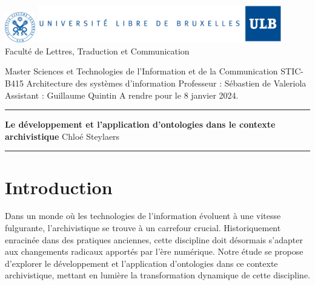 \documentclass[12pt]{report}
\begin{document}
    \begin{titlepage}
        \begin{center}
        \includegraphics[width=0.1\textwidth, margin= 0 -1.5cm 0 0]{l.jpg}
        \includegraphics[width=0.8\textwidth]{u.jpg}
        \vspace{0.5cm}
      \newline Faculté de Lettres, Traduction et Communication
     \end{center}
     \vspace*{1cm}
     Master Sciences et Technologies de l'Information et de la Communication
     \newline STIC-B415  Architecture des systèmes d'information 
       \vspace*{0,5cm}
        \newline Professeur : Sébastien de Valeriola
        \newline Assistant : Guillaume Quintin
     \newline A rendre pour le 8 janvier 2024.
      \vspace*{0,5cm}
     \newline \rule{11cm}{0,02cm}
     \vspace*{1,5cm}
     \newline \textbf{{\Large Le développement et l'application d'ontologies dans le contexte archivistique}}
       \vspace*{0,5cm}
     \vspace*{1cm}
     \newline Chloé Steylaers
     \vspace*{1,5cm}
     \newline \rule{4cm}{0,02cm}
\end{titlepage}
\newpage
\tableofcontents
\newpage
\chapter{Introduction}
Dans un monde où les technologies de l'information évoluent à une vitesse fulgurante, l'archivistique se trouve à un carrefour crucial. Historiquement enracinée dans des pratiques anciennes, cette discipline doit désormais s'adapter aux changements radicaux apportés par l'ère numérique. Notre étude se propose d'explorer le développement et l'application d'ontologies dans ce contexte archivistique, mettant en lumière la transformation dynamique de cette discipline.
\end{document}
